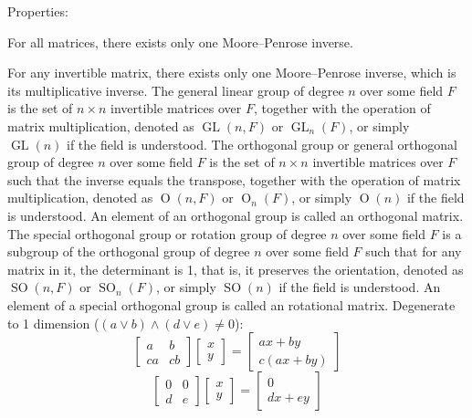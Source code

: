 \documentclass[a4paper,12pt]{report}
\begin{document}
Properties:
\bit
\item For all matrices, there exists only one Moore–Penrose inverse.
\item For any invertible matrix, there exists only one Moore–Penrose inverse, which is its multiplicative inverse.
\eit
{}
The general linear group of degree $n$ over some field $F$ is the set of $n\times n$ invertible matrices over $F$, together with the operation of matrix multiplication, denoted as $\operatorname{GL}(n,F)$ or $\operatorname{GL}_n(F)$, or simply $\operatorname{GL}(n)$ if the field is understood.
The orthogonal group or general orthogonal group of degree $n$ over some field $F$ is the set of $n\times n$ invertible matrices over $F$ such that the inverse equals the transpose, together with the operation of matrix multiplication, denoted as $\operatorname{O}(n,F)$ or $\operatorname{O}_n(F)$, or simply $\operatorname{O}(n)$ if the field is understood. An element of an orthogonal group is called an orthogonal matrix.
The special orthogonal group or rotation group of degree $n$ over some field $F$ is a subgroup of the orthogonal group of degree $n$ over some field $F$ such that for any matrix in it, the determinant is 1, that is, it preserves the orientation, denoted as $\operatorname{SO}(n,F)$ or $\operatorname{SO}_n(F)$, or simply $\operatorname{SO}(n)$ if the field is understood. An element of a special orthogonal group is called an rotational matrix.
Degenerate to 1 dimension ($(a\lor b)\land (d\lor e)\neq 0$):
\[\begin{bmatrix}a & b\\ca & cb\end{bmatrix}\begin{bmatrix}x \\ y\end{bmatrix}=\begin{bmatrix}ax+by \\ c(ax+by)\end{bmatrix}\]
\[\begin{bmatrix}0 & 0\\d & e\end{bmatrix}\begin{bmatrix}x \\ y\end{bmatrix}=\begin{bmatrix}0 \\ dx+ey\end{bmatrix}\]
\end{document}
